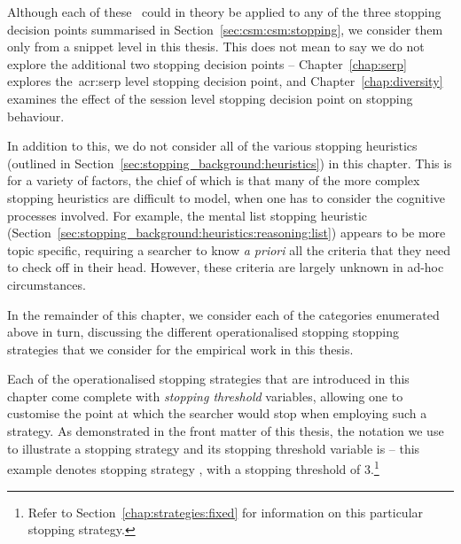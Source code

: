 Although each of these~ could in theory be applied to any of the three stopping decision points summarised in Section~\ref{sec:csm:csm:stopping}, we consider them only from a snippet level in this thesis. This does not mean to say we do not explore the additional two stopping decision points -- Chapter~\ref{chap:serp} explores the~\gls{acr:serp} level stopping decision point, and Chapter~\ref{chap:diversity} examines the effect of the session level stopping decision point on stopping behaviour.

In addition to this, we do not consider all of the various stopping heuristics (outlined in Section~\ref{sec:stopping_background:heuristics}) in this chapter. This is for a variety of factors, the chief of which is that many of the more complex stopping heuristics are difficult to model, when one has to consider the cognitive processes involved. For example, the mental list stopping heuristic (Section~\ref{sec:stopping_background:heuristics:reasoning:list}) appears to be more topic specific, requiring a searcher to know \emph{a priori} all the criteria that they need to check off in their head. However, these criteria are largely unknown in ad-hoc circumstances.

In the remainder of this chapter, we consider each of the categories enumerated above in turn, discussing the different operationalised stopping stopping strategies that we consider for the empirical work in this thesis.

Each of the operationalised stopping strategies that are introduced in this chapter come complete with \emph{stopping threshold} variables, allowing one to customise the point at which the searcher would stop when employing such a strategy. As demonstrated in the front matter of this thesis, the notation we use to illustrate a stopping strategy and its stopping threshold variable is  -- this example denotes stopping strategy , with a stopping threshold of $3$.\footnote{Refer to Section~\ref{chap:strategies:fixed} for information on this particular stopping strategy.}


